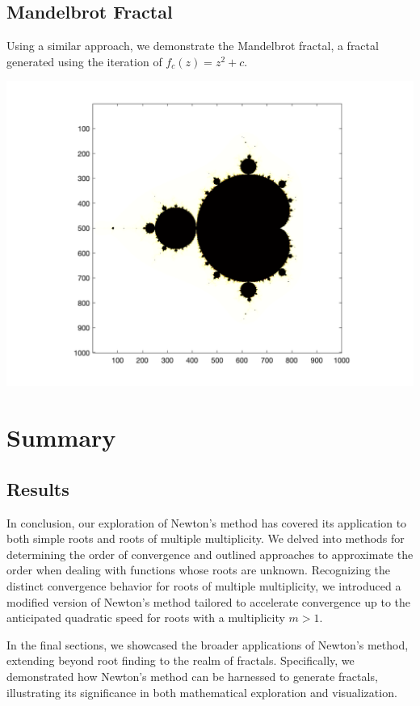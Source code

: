 \documentclass[11pt]{article}
\begin{document}


\subsection{Mandelbrot Fractal}

Using a similar approach, we demonstrate the Mandelbrot fractal, a fractal generated using the iteration of $f_c(z) = z^2 + c$.

\begin{center}
\includegraphics[width=0.7\linewidth]{mandelbrot.png}
\end{center}

\section{Summary}
\subsection{Results}
In conclusion, our exploration of Newton's method has covered its application to both simple roots and roots of multiple multiplicity. We delved into methods for determining the order of convergence and outlined approaches to approximate the order when dealing with functions whose roots are unknown. Recognizing the distinct convergence behavior for roots of multiple multiplicity, we introduced a modified version of Newton's method tailored to accelerate convergence up to the anticipated quadratic speed for roots with a multiplicity $m > 1$.

In the final sections, we showcased the broader applications of Newton's method, extending beyond root finding to the realm of fractals. Specifically, we demonstrated how Newton's method can be harnessed to generate fractals, illustrating its significance in both mathematical exploration and visualization. 
\end{document}
